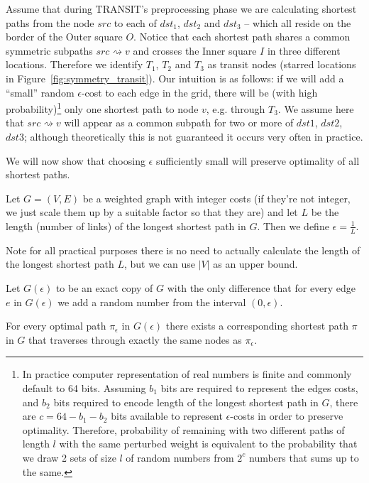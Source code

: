 Assume that during TRANSIT's preprocessing phase we are calculating shortest paths from the node $src$ to
each of $dst_1$, $dst_2$ and $dst_3$ -- which all reside on the border of the Outer square $O$.
Notice that each shortest path shares a common symmetric subpaths $src \rightsquigarrow v$ and crosses the Inner square $I$  in three  different locations.
 Therefore we identify $T_1$, $T_2$ and $T_3$ as transit nodes (starred locations in Figure~\ref{fig:symmetry_transit}). 
Our intuition is as follows: if we will add a ``small'' random $\epsilon$-cost
to each edge in the grid, there will be (with high probability)\footnote{
In practice computer representation of real numbers is finite and
commonly default to 64 bits. Assuming $b_1$ bits are required to represent the 
edges costs, and $b_2$ bits required to encode length of the longest shortest path in $G$, there are $c = 64 - b_1-b_2$ bits available to represent $\epsilon$-costs in order to preserve optimality. Therefore, probability of remaining with two different paths of length $l$ with the same perturbed weight is equivalent to the probability that we draw 2 sets of size $l$ of random numbers from $2^{c}$ numbers that sums up to the same.} only one shortest path to node $v$, e.g. through $T_{3}$.
We assume here that $src \rightsquigarrow v$ will appear as a common subpath for two or more of $dst1$, $dst2$, $dst3$; although theoretically this is not guaranteed it occurs very often in practice.

We will now show that choosing $\epsilon$ sufficiently small will preserve optimality of all shortest paths.

\begin{definition}
\label{definition:epsilon}
Let $G = (V, E)$ be a weighted graph with integer costs (if they're not integer, we just scale them up by a suitable factor so that they are) and let $L$ be the length (number of links) of the longest shortest path in $G$. Then we define $\epsilon = \frac{1}{L}$. 
\end{definition}
Note for all practical purposes there is no need to actually calculate the length of the longest shortest path $L$, but we can use $|V|$ as an upper bound.

\begin{definition}
Let $G(\epsilon)$ to be an exact copy of $G$ with the only difference that for every edge $e$ in $G(\epsilon)$ we add a
random number from the interval $(0, \epsilon)$.
\end{definition}

\begin{lemma}
\label{lemma:epsilon}
For every optimal path $\pi_{\epsilon}$ in $G(\epsilon)$
there exists a corresponding shortest path $\pi$ in $G$ that traverses
through exactly the same nodes as $\pi_{\epsilon}$.
\end{lemma}

